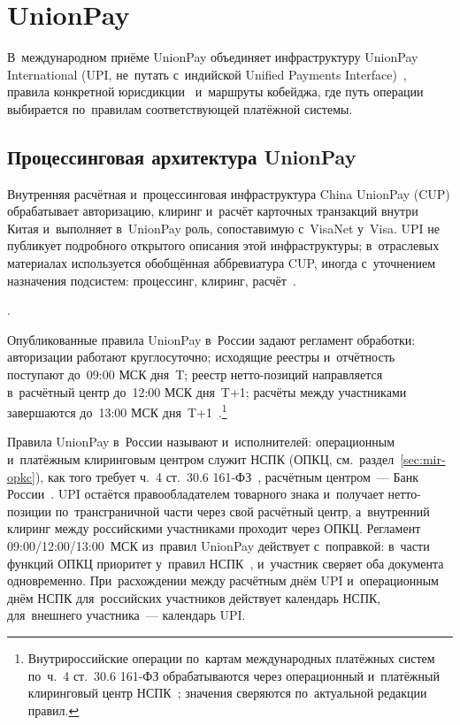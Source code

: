 
\chapter{UnionPay}\label{ch:unionpay}
В~международном приёме UnionPay объединяет инфраструктуру UnionPay
International (UPI, не~путать с~индийской Unified Payments Interface)~\cite{unionpay-international-about}, правила конкретной
юрисдикции~\cite{unionpay-russia-rules} и~маршруты кобейджа, где путь
операции выбирается по~правилам соответствующей платёжной системы.

\section{Процессинговая архитектура UnionPay}\label{sec:up-cups}

Внутренняя расчётная и~процессинговая инфраструктура China UnionPay (CUP)
обрабатывает авторизацию, клиринг и~расчёт карточных транзакций внутри Китая
и~выполняет в~UnionPay роль, сопоставимую с~VisaNet у~Visa. UPI не публикует
подробного открытого описания этой инфраструктуры; в~отраслевых материалах
используется обобщённая аббревиатура CUP, иногда с~уточнением назначения
подсистем: процессинг, клиринг, расчёт~\cite{unionpay-russia-rules}.

.

Опубликованные правила UnionPay в~России задают регламент обработки:
авторизации работают круглосуточно; исходящие реестры и~отчётность поступают
до~09:00 МСК дня~T; реестр нетто-позиций направляется в~расчётный центр
до~12:00 МСК дня~T+1; расчёты между участниками завершаются до~13:00 МСК
дня~T+1~\cite{unionpay-russia-rules}.\footnote{Внутрироссийские операции
  по~картам международных платёжных систем по~ч.~4 ст.~30.6
  161-ФЗ обрабатываются через операционный
  и~платёжный клиринговый центр НСПК~\cite{fz-161}; значения
сверяются по~актуальной редакции правил.}

Правила UnionPay в~России называют и~исполнителей: операционным
и~платёжным клиринговым центром служит НСПК (ОПКЦ,
см.~раздел~\ref{sec:mir-opkc}), как того требует ч.~4 ст.~30.6
161-ФЗ~\cite{fz-161}, расчётным центром~--- Банк
России~\cite{unionpay-russia-rules}. UPI остаётся правообладателем
товарного знака и~получает нетто-позиции по~трансграничной части через свой
расчётный центр, а~внутренний клиринг между российскими участниками проходит через
ОПКЦ. Регламент 09:00/12:00/13:00~МСК из~правил UnionPay действует с~поправкой:
в~части функций ОПКЦ приоритет у~правил НСПК~\cite{unionpay-russia-rules},
и~участник сверяет оба документа одновременно. При~расхождении между расчётным
днём UPI и~операционным днём НСПК для~российских участников действует
календарь НСПК, для~внешнего участника~--- календарь UPI.

